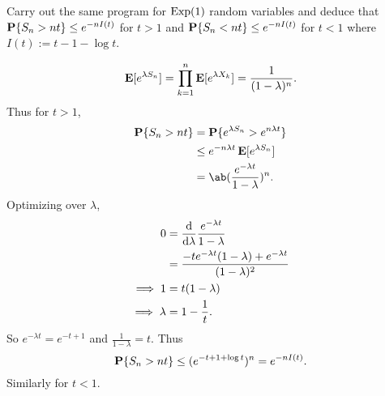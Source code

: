 \documentclass[12pt]{article}
\begin{document}
\begin{problem*}
    Carry out the same program for \iid $\operatorname{Exp}(1)$ random variables and
    deduce that $\operatorname{\mathbf P}\{S_n > nt\} \le e^{-nI(t)}$ for $t > 1$ and
    $\operatorname{\mathbf P}\{S_n < nt\} \le e^{-nI(t)}$ for $t < 1$ where
    $I(t) := t-1-\log t$.
\end{problem*}
\begin{solution}
    \[
        \operatorname{\mathbf E}[e^{\lambda S_n}] = \prod_{k=1}^n \operatorname{\mathbf E}[e^{\lambda X_k}]
        = \frac1{(1-\lambda)^n}.
    \] Thus for $t > 1$, \begin{align*}
        \P\set{S_n > nt} &= \P\set{e^{\lambda S_n} > e^{n\lambda t}} \\
            &\le e^{-n\lambda t} \E[e^{\lambda S_n}] \\
            &= \ab(\frac{e^{-\lambda t}}{1-\lambda})^n.
    \end{align*}
    Optimizing over $\lambda$, \begin{align*}
        0 &= \odv{}{\lambda} \frac{e^{-\lambda t}}{1 - \lambda} \\
            &= \frac{-t e^{-\lambda t}(1 - \lambda) + e^{-\lambda t}}{(1-\lambda)^2} \\
        \implies 1 &= t(1-\lambda) \\
        \implies \lambda &= 1 - \frac1t.
    \end{align*}
    So $e^{-\lambda t} = e^{-t+1}$ and $\frac1{1-\lambda} = t$.
    Thus \[
        \operatorname{\mathbf P}\{S_n > nt\} \le (e^{-t+1+\log t})^n = e^{-nI(t)}.
    \] Similarly for $t < 1$.
\end{solution}
\end{document}
